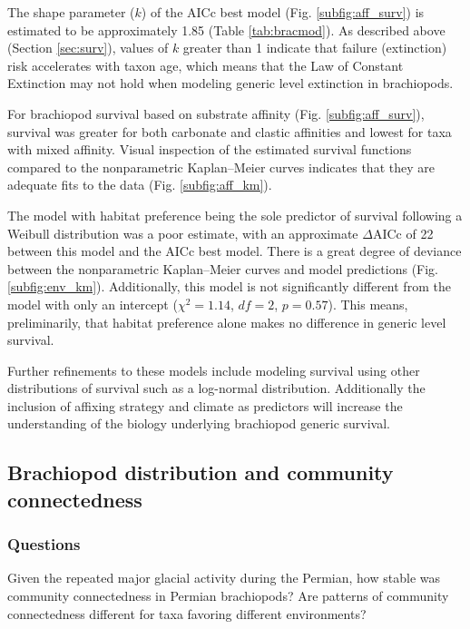 \documentclass[12pt,letterpaper]{article}
\begin{document}
The shape parameter (\(k\)) of the AICc best model (Fig. \ref{subfig:aff_surv}) is estimated to be approximately 1.85 (Table \ref{tab:bracmod}). As described above (Section \ref{sec:surv}), values of \(k\) greater than 1 indicate that failure (extinction) risk accelerates with taxon age, which means that the Law of Constant Extinction may not hold when modeling generic level extinction in brachiopods.

For brachiopod survival based on substrate affinity (Fig. \ref{subfig:aff_surv}), survival was greater for both carbonate and clastic affinities and lowest for taxa with mixed affinity. Visual inspection of the estimated survival functions compared to the nonparametric Kaplan--Meier curves indicates that they are adequate fits to the data (Fig. \ref{subfig:aff_km}). 

The model with habitat preference being the sole predictor of survival following a Weibull distribution was a poor estimate, with an approximate \(\Delta\)AICc of 22 between this model and the AICc best model. There is a great degree of deviance between the nonparametric Kaplan--Meier curves and model predictions (Fig. \ref{subfig:env_km}). Additionally, this model is not significantly different from the model with only an intercept (\(\chi^{2} = 1.14\), \(df = 2\), \(p = 0.57\)). This means, preliminarily, that habitat preference alone makes no difference in generic level survival.

Further refinements to these models include modeling survival using other distributions of survival such as a log-normal distribution. Additionally the inclusion of affixing strategy and climate as predictors will increase the understanding of the biology underlying brachiopod generic survival. 

\subsection{Brachiopod distribution and community connectedness} \label{sec:braccom}
\subsubsection{Questions} \label{sec:braccomques}
Given the repeated major glacial activity during the Permian, how stable was community connectedness in Permian brachiopods? Are patterns of community connectedness different for taxa favoring different environments?
\end{document}
